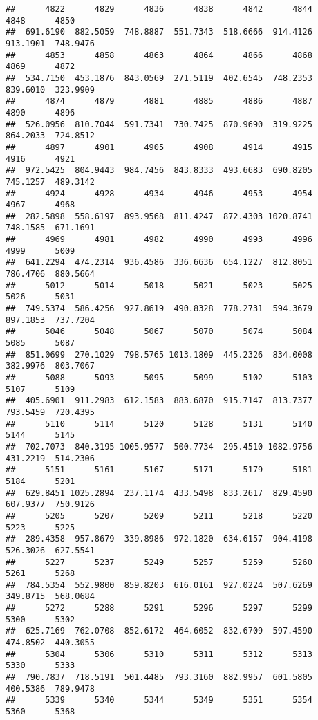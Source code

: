 \documentclass[
]{article}
\begin{document}
\begin{verbatim}
##      4822      4829      4836      4838      4842      4844      4848      4850 
##  691.6190  882.5059  748.8887  551.7343  518.6666  914.4126  913.1901  748.9476 
##      4853      4858      4863      4864      4866      4868      4869      4872 
##  534.7150  453.1876  843.0569  271.5119  402.6545  748.2353  839.6010  323.9909 
##      4874      4879      4881      4885      4886      4887      4890      4896 
##  526.0956  810.7044  591.7341  730.7425  870.9690  319.9225  864.2033  724.8512 
##      4897      4901      4905      4908      4914      4915      4916      4921 
##  972.5425  804.9443  984.7456  843.8333  493.6683  690.8205  745.1257  489.3142 
##      4924      4928      4934      4946      4953      4954      4967      4968 
##  282.5898  558.6197  893.9568  811.4247  872.4303 1020.8741  748.1585  671.1691 
##      4969      4981      4982      4990      4993      4996      4999      5009 
##  641.2294  474.2314  936.4586  336.6636  654.1227  812.8051  786.4706  880.5664 
##      5012      5014      5018      5021      5023      5025      5026      5031 
##  749.5374  586.4256  927.8619  490.8328  778.2731  594.3679  897.1853  737.7204 
##      5046      5048      5067      5070      5074      5084      5085      5087 
##  851.0699  270.1029  798.5765 1013.1809  445.2326  834.0008  382.9976  803.7067 
##      5088      5093      5095      5099      5102      5103      5107      5109 
##  405.6901  911.2983  612.1583  883.6870  915.7147  813.7377  793.5459  720.4395 
##      5110      5114      5120      5128      5131      5140      5144      5145 
##  702.7073  840.3195 1005.9577  500.7734  295.4510 1082.9756  431.2219  514.2306 
##      5151      5161      5167      5171      5179      5181      5184      5201 
##  629.8451 1025.2894  237.1174  433.5498  833.2617  829.4590  607.9377  750.9126 
##      5205      5207      5209      5211      5218      5220      5223      5225 
##  289.4358  957.8679  339.8986  972.1820  634.6157  904.4198  526.3026  627.5541 
##      5227      5237      5249      5257      5259      5260      5261      5268 
##  784.5354  552.9800  859.8203  616.0161  927.0224  507.6269  349.8715  568.0684 
##      5272      5288      5291      5296      5297      5299      5300      5302 
##  625.7169  762.0708  852.6172  464.6052  832.6709  597.4590  474.8502  440.3055 
##      5304      5306      5310      5311      5312      5313      5330      5333 
##  790.7837  718.5191  501.4485  793.3160  882.9957  601.5805  400.5386  789.9478 
##      5339      5340      5344      5349      5351      5354      5360      5368 

\end{verbatim}
\end{document}

